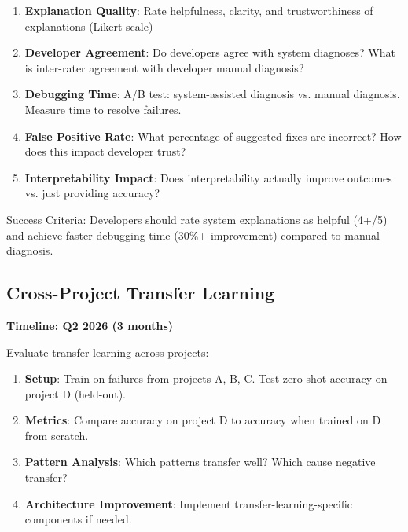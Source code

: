 \documentclass[11pt]{article}
\begin{document}
\begin{enumerate}
    \item \textbf{Explanation Quality}: Rate helpfulness, clarity, and trustworthiness of explanations (Likert scale)

    \item \textbf{Developer Agreement}: Do developers agree with system diagnoses? What is inter-rater agreement with developer manual diagnosis?

    \item \textbf{Debugging Time}: A/B test: system-assisted diagnosis vs. manual diagnosis. Measure time to resolve failures.

    \item \textbf{False Positive Rate}: What percentage of suggested fixes are incorrect? How does this impact developer trust?

    \item \textbf{Interpretability Impact}: Does interpretability actually improve outcomes vs. just providing accuracy?
\end{enumerate}

Success Criteria: Developers should rate system explanations as helpful (4+/5) and achieve faster debugging time (30\%+ improvement) compared to manual diagnosis.

\subsection{Cross-Project Transfer Learning}

\textbf{Timeline: Q2 2026 (3 months)}

Evaluate transfer learning across projects:

\begin{enumerate}
    \item \textbf{Setup}: Train on failures from projects A, B, C. Test zero-shot accuracy on project D (held-out).

    \item \textbf{Metrics}: Compare accuracy on project D to accuracy when trained on D from scratch.

    \item \textbf{Pattern Analysis}: Which patterns transfer well? Which cause negative transfer?

    \item \textbf{Architecture Improvement}: Implement transfer-learning-specific components if needed.
\end{enumerate}
\end{document}
